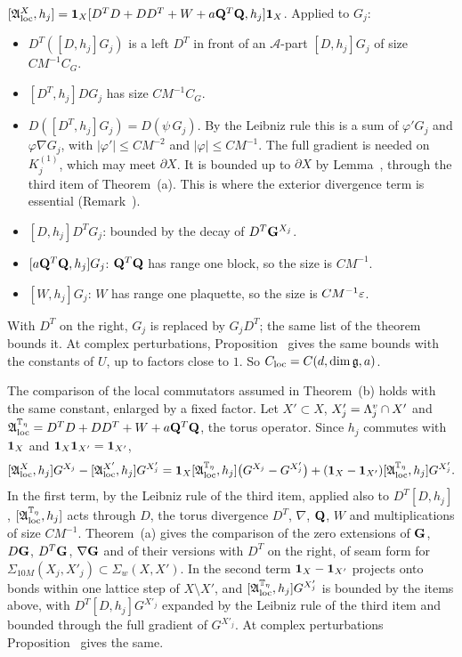 \begin{detail}
\begin{step}[(W2)]
\end{step}
\begin{step}
$[\mathfrak A^X_{\rm loc},h_j]=\mathbf 1_X[D^TD+DD^T+W+a\mathbf Q^T\mathbf Q,h_j]\mathbf 1_X$. Applied to $G_j$:
\begin{itemize}
\item $D^T([D,h_j]G_j)$ is a left $D^T$ in front of an $\mathcal A$-part $[D,h_j]G_j$ of size $CM^{-1}C_G$.
\item $[D^T,h_j]DG_j$ has size $CM^{-1}C_G$.
\item $D([D^T,h_j]G_j)=D(\psi\,G_j)$. By the Leibniz rule this is a sum of $\varphi'G_j$ and $\varphi\nabla G_j$, with $|\varphi'|\le CM^{-2}$ and $|\varphi|\le CM^{-1}$. The full gradient is needed on $K_j^{(1)}$, which may meet $\partial X$. It is bounded up to $\partial X$ by Lemma~, through the third item of Theorem~(a). This is where the exterior divergence term is essential (Remark~).
\item $[D,h_j]D^TG_j$: bounded by the decay of $D^T\mathbf G^{X_j}$.
\item $[a\mathbf Q^T\mathbf Q,h_j]G_j$: $\mathbf Q^T\mathbf Q$ has range one block, so the size is $CM^{-1}$.
\item $[W,h_j]G_j$: $W$ has range one plaquette, so the size is $CM^{-1}\varepsilon$.
\end{itemize}
With $D^T$ on the right, $G_j$ is replaced by $G_jD^T$; the same list of the theorem bounds it. At complex perturbations, Proposition~ gives the same bounds with the constants of $U$, up to factors close to $1$. So $C_{\rm loc}=C(d,\dim\mathfrak g,a)$.

The comparison of the local commutators assumed in Theorem~(b) holds with the same constant, enlarged by a fixed factor. Let $X'\subset X$, $X'_j=\Lambda^v_j\cap X'$ and $\mathfrak A^{\mathbb T_\eta}_{\rm loc}=D^TD+DD^T+W+a\mathbf Q^T\mathbf Q$, the torus operator. Since $h_j$ commutes with $\mathbf 1_X$ and $\mathbf 1_X\mathbf 1_{X'}=\mathbf 1_{X'}$,
\[
[\mathfrak A^X_{\rm loc},h_j]G^{X_j}-[\mathfrak A^{X'}_{\rm loc},h_j]G^{X'_j}=\mathbf 1_X[\mathfrak A^{\mathbb T_\eta}_{\rm loc},h_j]\big(G^{X_j}-G^{X'_j}\big)+(\mathbf 1_X-\mathbf 1_{X'})[\mathfrak A^{\mathbb T_\eta}_{\rm loc},h_j]G^{X'_j} .
\]
In the first term, by the Leibniz rule of the third item, applied also to $D^T[D,h_j]$, $[\mathfrak A^{\mathbb T_\eta}_{\rm loc},h_j]$ acts through $D$, the torus divergence $D^T$, $\nabla$, $\mathbf Q$, $W$ and multiplications of size $CM^{-1}$. Theorem~(a) gives the comparison of the zero extensions of $\mathbf G$, $D\mathbf G$, $D^T\mathbf G$, $\nabla\mathbf G$ and of their versions with $D^T$ on the right, of seam form for $\Sigma_{10M}(X_j,X'_j)\subset\Sigma_w(X,X')$. In the second term $\mathbf 1_X-\mathbf 1_{X'}$ projects onto bonds within one lattice step of $X\setminus X'$, and $[\mathfrak A^{\mathbb T_\eta}_{\rm loc},h_j]G^{X'_j}$ is bounded by the items above, with $D^T[D,h_j]G^{X'_j}$ expanded by the Leibniz rule of the third item and bounded through the full gradient of $G^{X'_j}$. At complex perturbations Proposition~ gives the same.
\end{step}
\end{detail}

